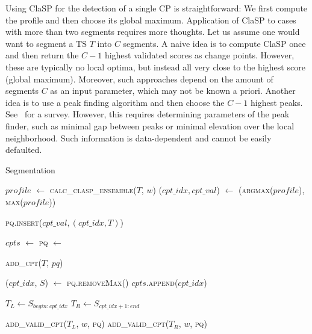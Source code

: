 \documentclass[pdflatex,sn-basic]{sn-jnl}
\begin{document}
Using ClaSP for the detection of a single CP is straightforward: We first compute the profile and then choose its global maximum. Application of ClaSP to cases with more than two segments requires more thoughts. Let us assume one would want to segment a TS $T$ into $C$ segments. A naive idea is to compute ClaSP once and then return the $C-1$ highest validated scores as change points. However, these are typically no local optima, but instead all very close to the highest score (global maximum). Moreover, such approaches depend on the amount of segments $C$ as an input parameter, which may not be known a priori. Another idea is to use a peak finding algorithm and then choose the $C-1$ highest peaks. See~\citep{Yang2008ComparisonOP} for a survey. However, this requires determining parameters of the peak finder, such as minimal gap between peaks or minimal elevation over the local neighborhood. Such information is data-dependent and cannot be easily defaulted.

\begin{algorithm}[t]
	\caption{Segmentation}\label{alg:recsplit}
	\begin{algorithmic}[1]
  
    	    \State $profile$ $\gets$ \textsc{calc\_clasp\_ensemble($T$, $w$)}
    	    \State ($cpt\_idx, cpt\_val$) $\gets$ (\textsc{argmax}($profile$), \textsc{max}($profile$))
    	    
    		 
        	    \State \textsc{pq.insert}($cpt\_val, (cpt\_idx, T)$)
    	    \EndIf
    	\EndProcedure
    	
		\State $cpts$ $\gets$ 
		\State \textsc{pq} $\gets$ 
	
		\State \textsc{add\_cpt}($T$, $pq$)

		 
			\State ($cpt\_idx$, $S$) $\gets$ \textsc{pq.removeMax()}
			\State $cpts$.\textsc{append}($cpt\_idx$) 
			
			\State $T_L \gets S_{begin:cpt\_idx}$ 
			\State $T_R \gets S_{cpt\_idx+1:end}$
			
			\State \textsc{add\_valid\_cpt}($T_L$, $w$, \textsc{pq}) 
			\State \textsc{add\_valid\_cpt}($T_R$, $w$, \textsc{pq})
		\EndWhile
		\State {}
		\EndProcedure
	\end{algorithmic}
\end{algorithm}
\end{document}
